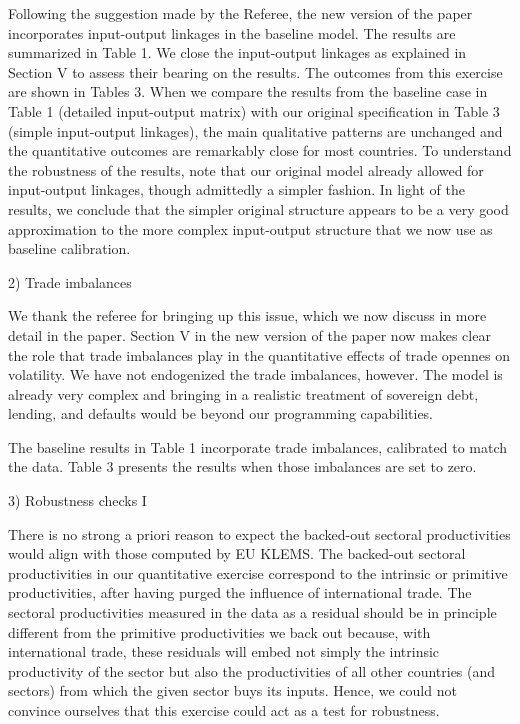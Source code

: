 \documentclass[12pt]{article}
\begin{document}
Following the suggestion made by the Referee, the new version of the paper
incorporates input-output linkages in the baseline model. The results are
summarized in Table 1. We close the input-output linkages as explained in
Section V to assess their bearing on the results. The outcomes from this
exercise are shown in Tables 3. When we compare the results from the
baseline case in Table 1 (detailed input-output matrix) with our original
specification in Table 3 (simple input-output linkages), the main
qualitative patterns are unchanged and the quantitative outcomes are
remarkably close for most countries. To understand the robustness of the
results, note that our original model already allowed for input-output
linkages, though admittedly a simpler fashion. In light of the results, we
conclude that the simpler original structure appears to be a very good
approximation to the more complex input-output structure that we now use as
baseline calibration.\bigskip

2) Trade imbalances

We thank the referee for bringing up this issue, which we now discuss in
more detail in the paper. Section V in the new version of the paper now
makes clear the role that trade imbalances play in the quantitative effects
of trade opennes on volatility. We have not endogenized the trade
imbalances, however. The model is already very complex and bringing in a
realistic treatment of sovereign debt, lending, and defaults would be beyond
our programming capabilities.

The baseline results in Table 1 incorporate trade imbalances, calibrated to
match the data. Table 3 presents the results when those imbalances are set
to zero.\bigskip

3) Robustness checks I

There is no strong a priori reason to expect the backed-out sectoral
productivities would align with those computed by EU KLEMS. The backed-out
sectoral productivities in our quantitative exercise correspond to the
intrinsic or primitive productivities, after having purged the influence of
international trade. The sectoral productivities measured in the data as a
residual should be in principle different from the primitive productivities
we back out because, with international trade, these residuals will embed
not simply the intrinsic productivity of the sector but also the
productivities of all other countries (and sectors) from which the given
sector buys its inputs. Hence, we could not convince ourselves that this
exercise could act as a test for robustness.\bigskip
\end{document}
